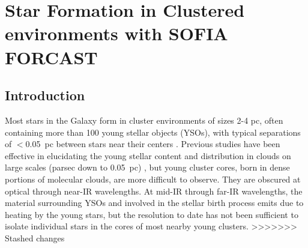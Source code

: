 \chapter{Star Formation in Clustered environments with SOFIA FORCAST}

\label{chap:SOFIA}

\section{Introduction}
Most stars in the Galaxy form in cluster environments of sizes 2-4 pc, often containing more than 100 young stellar objects (YSOs), with typical separations of $<$0.05~pc between stars near their centers \citep{Porras:2003kxa, Allen:2007wqa, Gutermuth:2009gca}.
Previous studies have been effective in elucidating the young stellar content and distribution in clouds on large scales (parsec down to 0.05~pc) \citep{Evans-ARAA2012}, but young cluster cores, born in dense portions of molecular clouds, are more difficult to observe. They are obscured at optical through near-IR wavelengths. At mid-IR through far-IR wavelengths, the material surrounding YSOs and involved in the stellar birth process emits due to heating by the young stars, but the resolution to date has not been sufficient to isolate individual stars in the cores of most nearby young clusters.
>>>>>>> Stashed changes



